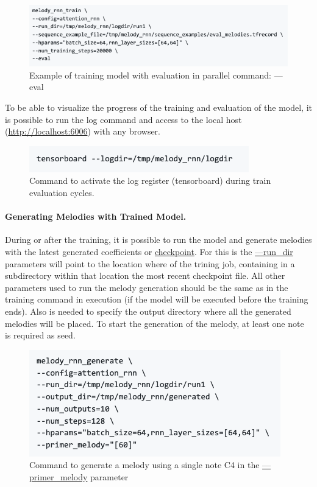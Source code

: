 \begin{figure}[h!]
  \caption{Example of training model with evaluation in parallel command: —eval}
  \includegraphics[width=\linewidth]{image/fig_JDF06.png}
\end{figure}


To be able to visualize the progress of the training and evaluation of the model, it is
possible to run the log command and access to the local host (\url{http://localhost:6006})
with any browser.

\begin{figure}[h!]
  \caption{Command to activate the log register (tensorboard) during train evaluation
    cycles.}
  \includegraphics[width=\linewidth]{image/fig_JDF07.png}
\end{figure}



\paragraph{Generating Melodies with Trained Model.} During or after the training, it is
possible to run the model and generate melodies with the latest generated coefficients or
\url{checkpoint}. For this is the \url{—run_dir} parameters will point to the location
where of the trining job, containing in a subdirectory within that location the most
recent checkpoint file. All other parameters used to run the melody generation should be
the same as in the training command in execution (if the model will be executed before the
training ends). Also is needed to specify the output directory where all the generated
melodies will be placed. To start the generation of the melody, at least one note is
required as seed.

\begin{figure}[h!]
  \caption{Command to generate a melody using a single note C4 in the \url{—primer_melody} parameter}
  \includegraphics[width=\linewidth]{image/fig_JDF08.png}
\end{figure}


